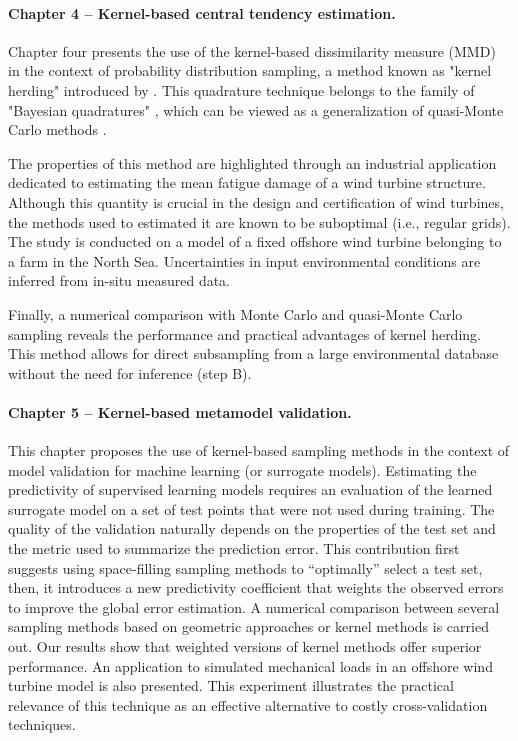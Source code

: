 \paragraph{Chapter 4 -- Kernel-based central tendency estimation.} 
Chapter four presents the use of the kernel-based dissimilarity measure (MMD) in the context of probability distribution sampling, a method known as "kernel herding" introduced by \citet{chen_welling_2010}. 
This quadrature technique belongs to the family of "Bayesian quadratures" \citet{briol_oates_2019}, which can be viewed as a generalization of quasi-Monte Carlo methods \citet{hickernell_2020}. 

The properties of this method are highlighted through an industrial application dedicated to estimating the mean fatigue damage of a wind turbine structure. 
Although this quantity is crucial in the design and certification of wind turbines, the methods used to estimated it are known to be suboptimal (i.e., regular grids). 
The study is conducted on a model of a fixed offshore wind turbine belonging to a farm in the North Sea. 
Uncertainties in input environmental conditions are inferred from in-situ measured data. 

Finally, a numerical comparison with Monte Carlo and quasi-Monte Carlo sampling reveals the performance and practical advantages of kernel herding. 
This method allows for direct subsampling from a large environmental database without the need for inference (step B).


\paragraph{Chapter 5 -- Kernel-based metamodel validation.} 
This chapter proposes the use of kernel-based sampling methods in the context of model validation for machine learning (or surrogate models). 
Estimating the predictivity of supervised learning models requires an evaluation of the learned surrogate model on a set of test points that were not used during training. 
The quality of the validation naturally depends on the properties of the test set and the metric used to summarize the prediction error. 
This contribution first suggests using space-filling sampling methods to ``optimally'' select a test set, then, 
it introduces a new predictivity coefficient that weights the observed errors to improve the global error estimation. 
A numerical comparison between several sampling methods based on geometric approaches \citep{shang_apley_2020} or kernel methods \cite{chen_welling_2010,mak_joseph_2018} is carried out. 
Our results show that weighted versions of kernel methods offer superior performance. 
An application to simulated mechanical loads in an offshore wind turbine model is also presented. 
This experiment illustrates the practical relevance of this technique as an effective alternative to costly cross-validation techniques.

